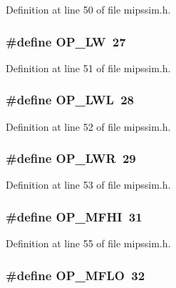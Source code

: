 Definition at line 50 of file mipssim.\+h.

\subsubsection[{O\+P\+\_\+\+LW}]{\setlength{\rightskip}{0pt plus 5cm}\#define O\+P\+\_\+\+LW~27}\label{mipssim_8h_a9478d756846491c866d134aab8c48297}


Definition at line 51 of file mipssim.\+h.

\subsubsection[{O\+P\+\_\+\+L\+WL}]{\setlength{\rightskip}{0pt plus 5cm}\#define O\+P\+\_\+\+L\+WL~28}\label{mipssim_8h_a0ba961155ed973ea0e146800576ff0d0}


Definition at line 52 of file mipssim.\+h.

\subsubsection[{O\+P\+\_\+\+L\+WR}]{\setlength{\rightskip}{0pt plus 5cm}\#define O\+P\+\_\+\+L\+WR~29}\label{mipssim_8h_a061d01117787a6aa2547c05d550becac}


Definition at line 53 of file mipssim.\+h.

\subsubsection[{O\+P\+\_\+\+M\+F\+HI}]{\setlength{\rightskip}{0pt plus 5cm}\#define O\+P\+\_\+\+M\+F\+HI~31}\label{mipssim_8h_a77f0e1752a1d6d9134c5a2af132e8290}


Definition at line 55 of file mipssim.\+h.

\subsubsection[{O\+P\+\_\+\+M\+F\+LO}]{\setlength{\rightskip}{0pt plus 5cm}\#define O\+P\+\_\+\+M\+F\+LO~32}\label{mipssim_8h_aee3bbc80cd1a388de0b6cd40a6b9a0a1}


